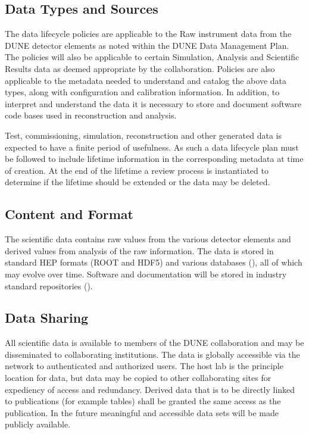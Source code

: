 \documentclass[../main-v1.tex]{subfiles}
\begin{document}
\subsection{
 Data Types and Sources}
The data lifecycle policies are applicable to the Raw instrument data from the DUNE detector elements as noted within the DUNE Data Management Plan.  The policies will also be applicable to certain Simulation, Analysis and Scientific Results data as deemed appropriate by the collaboration.  Policies are also applicable to the metadata needed to understand and catalog the above data types, along with configuration and calibration information.  In addition, to interpret and understand the data it is necessary to store and document software code bases used in reconstruction and analysis.

Test, commissioning, simulation, reconstruction and other generated data is expected to have a finite period of usefulness.  As such a data lifecycle plan must be followed to include lifetime information in the corresponding metadata at time of creation.  At the end of the lifetime a review process is instantiated to determine if the lifetime should be extended or the data may be deleted.

\subsection{Content and Format}
The scientific data contains raw values from the various detector elements and derived values from analysis of the raw information.  The data is stored in standard HEP formats (ROOT and HDF5) and various databases (), all of which may evolve over time.  Software and documentation will be stored in industry standard repositories ().

\subsection{ Data Sharing}
All scientific data is available to members of the DUNE collaboration and may be disseminated to collaborating institutions.  The data is globally accessible via the network to authenticated and authorized users.  The host lab is the principle location for data, but data may be copied to other collaborating sites for expediency of access and redundancy.
Derived data that is to be directly linked to publications (for example tables) shall be granted the same access as the publication.  In the future meaningful and accessible data sets will be made publicly available.
\end{document}

